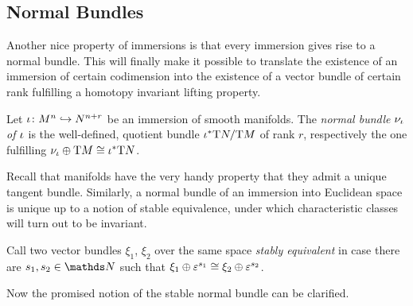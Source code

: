 \subsection{Normal Bundles}
Another nice property of immersions is that every immersion gives
rise to a normal bundle. This will finally make it possible to
translate the existence of an immersion of certain codimension into
the existence of a vector bundle of certain rank fulfilling a homotopy
invariant lifting property.
\begin{Def}
  Let ${\iota}\colon M^n\hookrightarrow N^{n+r}$ be an immersion of smooth
  manifolds.
  The \emph{normal bundle $\nu_{{\iota}}$ of ${\iota}$}
  is the well-defined, quotient bundle ${{\iota}}^*\mathrm{T}N/\mathrm{T}M$ of rank $r$,
  respectively the one fulfilling
  $\nu_{{\iota}}\oplus\mathrm{T}M\cong{{\iota}}^*\mathrm{T}N$.
\end{Def}
Recall that manifolds have the very handy property that they admit a
unique tangent bundle.
Similarly, a normal bundle of an immersion into Euclidean space is
unique up to a notion of stable equivalence, under which
characteristic classes will turn out to be invariant.
\begin{Def}
  Call two vector bundles $\xi_1$, $\xi_2$ over the same space 
  \emph{stably equivalent} in case there are $s_1, s_2\in\Nat$ such
  that $\xi_1\oplus\varepsilon^{s_1}\cong\xi_2\oplus\varepsilon^{s_2}$.
\end{Def}
Now the promised notion of the stable normal bundle can be clarified.
